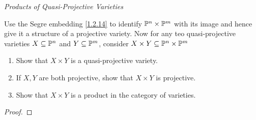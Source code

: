 \label{1.3.16}

\emph{Products of Quasi-Projective Varieties}

Use the Segre embedding \ref{1.2.14} to identify $\P^n \times \P^m$ with its image and hence give it a structure of a projective variety. Now for any teo quasi-projective varieties $X \subseteq \P^n$ and $Y \subseteq \P^m$, consider $X \times Y \subseteq \P^n \times \P^m$

\begin{enumerate}[label = (\alph*)]
    \item Show that $X \times Y$ is a quasi-projective variety.

    \item If $X, Y$ are both projective, show that $X \times Y$ is projective.

    \item Show that $X \times Y$ is a product in the category of varieties.
\end{enumerate}

\begin{proof}

\end{proof}
